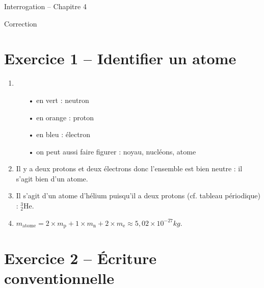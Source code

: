 \documentclass[12pt,a4paper]{article}
\begin{document}
\begin{header}
Interrogation -- Chapitre 4

Correction
\end{header}

\section*{Exercice 1 -- Identifier un atome}

\begin{enumerate}
\item
\begin{itemize}
\item[•] en vert : neutron
\item[•] en orange : proton
\item[•] en bleu : électron
\item[•] on peut aussi faire figurer : noyau, nucléons, atome
\end{itemize}
\item Il y a deux protons et deux électrons donc l'ensemble est bien neutre : il s'agit bien d'un atome.
\item Il s'agit d'un atome d'hélium puisqu'il a deux protons (cf. tableau périodique) : $^\text{3}_\text{2}\text{He}$.
\item $m_\mathrm{atome} = 2 \times m_\mathrm{p} + 1 \times m_\mathrm{n} + 2 \times m_\mathrm{e} \approx \unit{5{,}02\times 10^{-27}}{kg}.$
\end{enumerate}

\section*{Exercice 2 -- Écriture conventionnelle}
\end{document}
